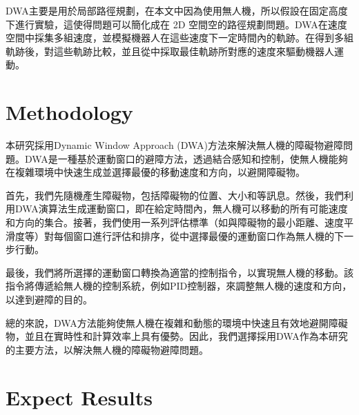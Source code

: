 \documentclass[12pt, a4paper, oneside]{article}
\begin{document}
     DWA主要是用於局部路徑規劃，在本文中因為使用無人機，所以假設在固定高度下進行實驗，這使得問題可以簡化成在 2D 空間空的路徑規劃問題。DWA在速度空間中採集多組速度，並模擬機器人在這些速度下一定時間內的軌跡。在得到多組軌跡後，對這些軌跡比較，並且從中採取最佳軌跡所對應的速度來驅動機器人運動。
	\section{Methodology}
	本研究採用Dynamic Window Approach (DWA)方法來解決無人機的障礙物避障問題。DWA是一種基於運動窗口的避障方法，透過結合感知和控制，使無人機能夠在複雜環境中快速生成並選擇最優的移動速度和方向，以避開障礙物。
	
	首先，我們先隨機產生障礙物，包括障礙物的位置、大小和等訊息。然後，我們利用DWA演算法生成運動窗口，即在給定時間內，無人機可以移動的所有可能速度和方向的集合。接著，我們使用一系列評估標準（如與障礙物的最小距離、速度平滑度等）對每個窗口進行評估和排序，從中選擇最優的運動窗口作為無人機的下一步行動。
	
	最後，我們將所選擇的運動窗口轉換為適當的控制指令，以實現無人機的移動。該指令將傳遞給無人機的控制系統，例如PID控制器，來調整無人機的速度和方向，以達到避障的目的。
	
	總的來說，DWA方法能夠使無人機在複雜和動態的環境中快速且有效地避開障礙物，並且在實時性和計算效率上具有優勢。因此，我們選擇採用DWA作為本研究的主要方法，以解決無人機的障礙物避障問題。
	\section{Expect Results}
	
\end{document}
